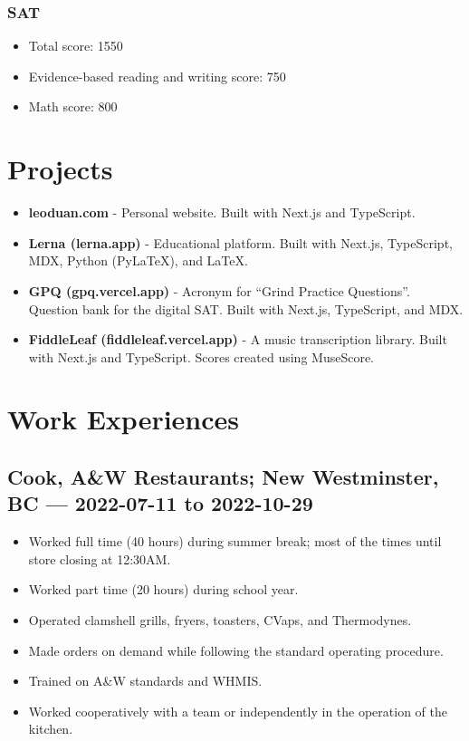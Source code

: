 \documentclass{article}
\begin{document}
\subsubsection*{SAT}

\begin{itemize}
	\item Total score: 1550
	\item Evidence-based reading and writing score: 750
	\item Math score: 800
\end{itemize}

\section*{Projects}

\begin{itemize}
	\item \textbf{leoduan.com} - Personal website. Built with Next.js and TypeScript.
	\item \textbf{Lerna (lerna.app)} - Educational platform. Built with Next.js, TypeScript, MDX, Python (PyLaTeX), and LaTeX.
	\item \textbf{GPQ (gpq.vercel.app)} - Acronym for ``Grind Practice Questions''. Question bank for the digital SAT. Built with Next.js, TypeScript, and MDX.
	\item \textbf{FiddleLeaf (fiddleleaf.vercel.app)} - A music transcription library. Built with Next.js and TypeScript. Scores created using MuseScore.
\end{itemize}

\section*{Work Experiences}

\subsection*{Cook, A\&W Restaurants; New Westminster, BC — 2022-07-11 to 2022-10-29}

\begin{itemize}
	\item Worked full time (40 hours) during summer break; most of the times until store closing at 12:30AM.
	\item Worked part time (20 hours) during school year.
	\item Operated clamshell grills, fryers, toasters, CVaps, and Thermodynes.
	\item Made orders on demand while following the standard operating procedure.
	\item Trained on A\&W standards and WHMIS.
	\item Worked cooperatively with a team or independently in the operation of the kitchen.
\end{itemize}
\end{document}
